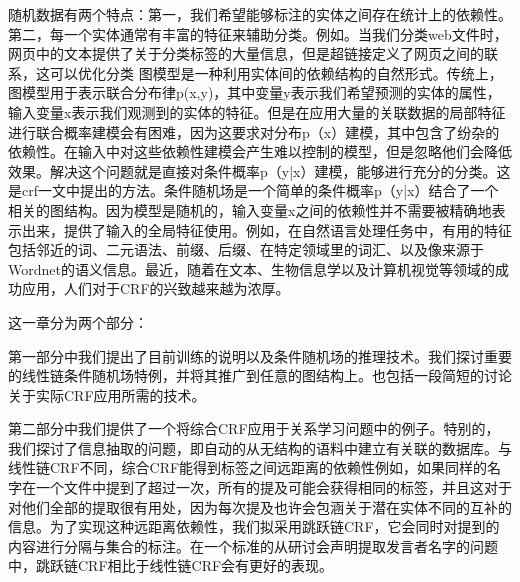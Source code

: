 
随机数据有两个特点：第一，我们希望能够标注的实体之间存在统计上的依赖性。第二，每一个实体通常有丰富的特征来辅助分类。例如。当我们分类web文件时，网页中的文本提供了关于分类标签的大量信息，但是超链接定义了网页之间的联系，这可以优化分类
图模型是一种利用实体间的依赖结构的自然形式。传统上，图模型用于表示联合分布律p(x,y)，其中变量y表示我们希望预测的实体的属性，输入变量x表示我们观测到的实体的特征。但是在应用大量的关联数据的局部特征进行联合概率建模会有困难，因为这要求对分布p（x）建模，其中包含了纷杂的依赖性。在输入中对这些依赖性建模会产生难以控制的模型，但是忽略他们会降低效果。解决这个问题就是直接对条件概率p（y|x）建模，能够进行充分的分类。这是crf一文中提出的方法。条件随机场是一个简单的条件概率p（y|x）结合了一个相关的图结构。因为模型是随机的，输入变量x之间的依赖性并不需要被精确地表示出来，提供了输入的全局特征使用。例如，在自然语言处理任务中，有用的特征包括邻近的词、二元语法、前缀、后缀、在特定领域里的词汇、以及像来源于Wordnet的语义信息。最近，随着在文本、生物信息学以及计算机视觉等领域的成功应用，人们对于CRF的兴致越来越为浓厚。

这一章分为两个部分：

第一部分中我们提出了目前训练的说明以及条件随机场的推理技术。我们探讨重要的线性链条件随机场特例，并将其推广到任意的图结构上。也包括一段简短的讨论关于实际CRF应用所需的技术。

第二部分中我们提供了一个将综合CRF应用于关系学习问题中的例子。特别的，我们探讨了信息抽取的问题，即自动的从无结构的语料中建立有关联的数据库。与线性链CRF不同，综合CRF能得到标签之间远距离的依赖性例如，如果同样的名字在一个文件中提到了超过一次，所有的提及可能会获得相同的标签，并且这对于对他们全部的提取很有用处，因为每次提及也许会包涵关于潜在实体不同的互补的信息。为了实现这种远距离依赖性，我们拟采用跳跃链CRF，它会同时对提到的内容进行分隔与集合的标注。在一个标准的从研讨会声明提取发言者名字的问题中，跳跃链CRF相比于线性链CRF会有更好的表现。